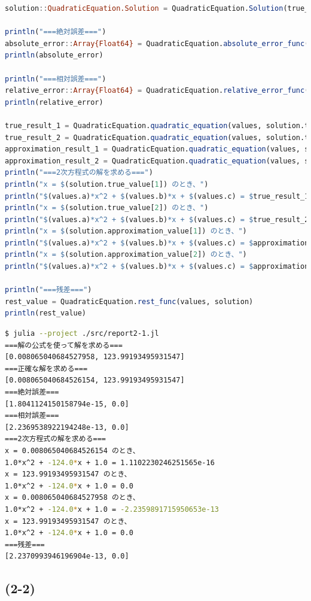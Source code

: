 \documentclass[uplatex, dvipdfmx, a4j,11pt]{jsarticle}
\begin{document}
\begin{lstlisting}[title={(2-1)のソースコード}, label=code:in, language=Julia]
solution::QuadraticEquation.Solution = QuadraticEquation.Solution(true_value, approximation_value)

println("===絶対誤差===")
absolute_error::Array{Float64} = QuadraticEquation.absolute_error_func(solution)
println(absolute_error)

println("===相対誤差===")
relative_error::Array{Float64} = QuadraticEquation.relative_error_func(solution)
println(relative_error)

true_result_1 = QuadraticEquation.quadratic_equation(values, solution.true_value[1])
true_result_2 = QuadraticEquation.quadratic_equation(values, solution.true_value[2])
approximation_result_1 = QuadraticEquation.quadratic_equation(values, solution.approximation_value[1])
approximation_result_2 = QuadraticEquation.quadratic_equation(values, solution.approximation_value[2])
println("===2次方程式の解を求める===")
println("x = $(solution.true_value[1]) のとき、")
println("$(values.a)*x^2 + $(values.b)*x + $(values.c) = $true_result_1")
println("x = $(solution.true_value[2]) のとき、")
println("$(values.a)*x^2 + $(values.b)*x + $(values.c) = $true_result_2")
println("x = $(solution.approximation_value[1]) のとき、")
println("$(values.a)*x^2 + $(values.b)*x + $(values.c) = $approximation_result_1")
println("x = $(solution.approximation_value[2]) のとき、")
println("$(values.a)*x^2 + $(values.b)*x + $(values.c) = $approximation_result_2")

println("===残差===")
rest_value = QuadraticEquation.rest_func(values, solution)
println(rest_value)

\end{lstlisting}

\newpage
\begin{lstlisting}[title={実行結果}, label=code:in, language=sh]
$ julia --project ./src/report2-1.jl
===解の公式を使って解を求める===
[0.008065040684527958, 123.99193495931547]
===正確な解を求める===
[0.008065040684526154, 123.99193495931547]
===絶対誤差===
[1.8041124150158794e-15, 0.0]
===相対誤差===
[2.2369538922194248e-13, 0.0]
===2次方程式の解を求める===
x = 0.008065040684526154 のとき、
1.0*x^2 + -124.0*x + 1.0 = 1.1102230246251565e-16
x = 123.99193495931547 のとき、
1.0*x^2 + -124.0*x + 1.0 = 0.0
x = 0.008065040684527958 のとき、
1.0*x^2 + -124.0*x + 1.0 = -2.2359891715950653e-13
x = 123.99193495931547 のとき、
1.0*x^2 + -124.0*x + 1.0 = 0.0
===残差===
[2.2370993946196904e-13, 0.0]

\end{lstlisting}

\subsection*{(2-2)}
\end{document}

